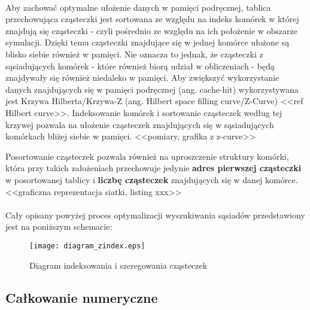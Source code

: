\paragraph{}
Aby zachować optymalne ułożenie danych w pamięci podręcznej, tablica przechowująca cząsteczki jest sortowana ze względu na indeks komórek w której znajdują się cząsteczki - czyli pośrednio ze względu na ich położenie w obszarze symulacji. Dzięki temu cząsteczki znajdujące się w jednej komórce ułożone są blisko siebie również w pamięci. Nie oznacza to jednak, że cząsteczki z sąsiadujących komórek - które również biorą udział w obliczeniach - będą znajdywały się również niedaleko w pamięci. Aby zwiększyć wykorzystanie danych znajdujących się w pamięci podręcznej (ang. cache-hit) wykorzystywana jest Krzywa Hilberta/Krzywa-Z (ang. Hilbert space filling curve/Z-Curve) <<ref Hilbert curve>>. Indeksowanie komórek i sortowanie cząsteczek według tej krzywej pozwala na ułożenie cząsteczek znajdujących się w sąsiadujących komórkach bliżej siebie w pamięci. <<pomiary, grafika z z-curve>>
\par
Posortowanie cząsteczek pozwala również na uproszczenie struktury komórki, która przy takich założeniach przechowuje jedynie \textbf{adres pierwszej cząsteczki} w posortowanej tablicy i \textbf{liczbę cząsteczek} znajdujących się w danej komórce. <<graficzna reprezentacja siatki, listing xxx>>
\par

\paragraph{}
Cały opisany powyżej proces optymalizacji wyszukiwania sąsiadów przedstawiony jest na poniższym schemacie:
\par
\begin{figure}[h]
\centering
\caption{Diagram indeksowania i szeregowania cząsteczek}
\texttt{[image: diagram\_zindex.eps]}
\label{fig:diagram_zindex}
\end{figure}

\subsection{Całkowanie numeryczne}

\paragraph{}

